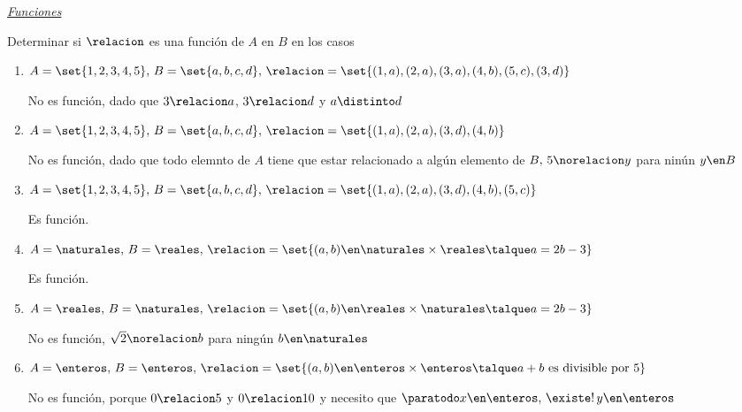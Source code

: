 \underline{\textit{Funciones}}\par
\begin{enunciado}{\ejercicio}
  Determinar si $\relacion$ es una función de $A$ en $B$ en los casos
\end{enunciado}
  \begin{enumerate}[label=\roman*)]
    \item $A = \set{1,2,3,4,5},\, B = \set{a,b,c,d},\, \relacion = \set{(1,a), (2,a),(3,a),(4,b),(5,c),(3,d)} $\par
          No es función, dado que $3 \relacion a$, $3 \relacion d$ y $a \distinto d$

    \item $A = \set{1,2,3,4,5},\, B = \set{a,b,c,d},\, \relacion = \set{(1,a), (2,a),(3,d),(4,b)}$\par
          No es función, dado que todo elemnto de $A$ tiene que estar relacionado a algún elemento de $B,\, 5 \norelacion y$ para ninún $ y \en B$

    \item $A = \set{1,2,3,4,5},\, B = \set{a,b,c,d},\, \relacion = \set{(1,a), (2,a),(3,d),(4,b),(5,c)} $\par
          Es función.

    \item $A = \naturales,\, B = \reales, \, \relacion = \set{(a,b) \en \naturales \times \reales \talque a = 2b - 3} $\par
          Es función.

    \item $A = \reales,\, B = \naturales, \, \relacion = \set{(a,b) \en \reales \times \naturales \talque a = 2b - 3} $\par
          No es función, $\sqrt{2} \norelacion b$ para ningún $b \en \naturales$
    \item $A = \enteros,\, B = \enteros, \, \relacion = \set{(a,b) \en \enteros \times \enteros \talque a +b \text{ es divisible por }5} $\par
          No es función, porque $0 \relacion 5$ y $0 \relacion 10$ y necesito que $\paratodo x \en \enteros,\, \existe!\, y \en \enteros$
  \end{enumerate}
